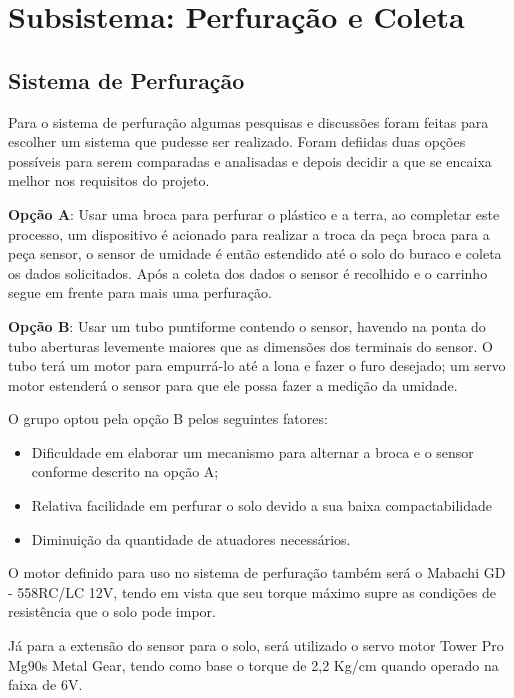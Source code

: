 \section{Subsistema: Perfuração e Coleta}

  \subsection{Sistema de Perfuração}
  
  Para o sistema de perfuração algumas pesquisas e discussões foram feitas para escolher um sistema que pudesse ser realizado. Foram defiidas duas opções possíveis para serem comparadas e analisadas e depois decidir a que se encaixa melhor nos requisitos do projeto.

  \textbf{Opção A}: Usar uma broca para perfurar o plástico e a terra, ao completar este
  processo, um dispositivo é acionado para realizar a troca da peça broca para
  a peça sensor, o sensor de umidade é então estendido até o solo do buraco e
  coleta os dados solicitados. Após a coleta dos dados o sensor é recolhido e o
  carrinho segue em frente para mais uma perfuração.

  \textbf{Opção B}: Usar um tubo puntiforme contendo o sensor, havendo na ponta do tubo
  aberturas levemente maiores que as dimensões dos terminais do sensor. O tubo
  terá um motor para empurrá-lo até a lona e fazer o furo desejado; um servo
  motor estenderá o sensor para que ele possa fazer a medição da umidade.

  O grupo optou pela opção B pelos seguintes fatores:

  \begin{itemize}
    \item Dificuldade em elaborar um mecanismo para alternar a broca e o sensor
    conforme descrito na opção A;
    \item Relativa facilidade em perfurar o solo devido a sua baixa compactabilidade
    \item Diminuição da quantidade de atuadores necessários.
  \end{itemize}

  O motor definido para uso no sistema de perfuração também será o
  Mabachi GD - 558RC/LC 12V, tendo em vista que seu torque máximo supre as
  condições de resistência que o solo pode impor.

  Já para a extensão do sensor para o solo, será utilizado o servo motor Tower
  Pro Mg90s Metal Gear, tendo como base o torque de 2,2 Kg/cm quando operado na faixa de 6V.

